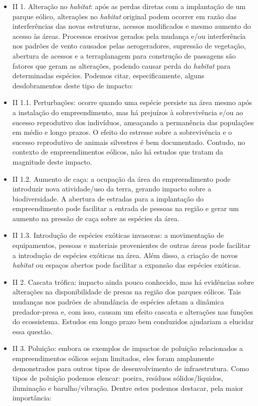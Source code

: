 \documentclass[
  oneside]{scrbook}
\providecommand{\tightlist}{%
  \setlength{\itemsep}{0pt}\setlength{\parskip}{0pt}}
\begin{document}
\begin{itemize}
\tightlist
\item
  II 1. Alteração no \emph{habitat}: após as perdas diretas com a implantação de um parque eólico, alterações no \emph{habitat} original podem ocorrer em razão das interferências das novas estruturas, acessos modificados e mesmo aumento do acesso às áreas. Processos erosivos gerados pela mudança e/ou interferência nos padrões de vento causados pelas aerogeradores, supressão de vegetação, abertura de acessos e a terraplanagem para construção de passagens são fatores que geram as alterações, podendo causar perda do \emph{habitat} para determinadas espécies. Podemos citar, especificamente, alguns desdobramentos deste tipo de impacto:
\item
  II 1.1. Perturbações: ocorre quando uma espécie persiste na área mesmo após a instalação do empreendimento, mas há prejuízos à sobrevivência e/ou ao sucesso reprodutivo dos indivíduos, ameaçando a permanência das populações em médio e longo prazos. O efeito do estresse sobre a sobrevivência e o sucesso reprodutivo de animais silvestres é bem documentado. Contudo, no contexto de empreendimentos eólicos, não há estudos que tratam da magnitude deste impacto.
\item
  II 1.2. Aumento de caça: a ocupação da área do empreendimento pode introduzir nova atividade/uso da terra, gerando impacto sobre a biodiversidade. A abertura de estradas para a implantação do empreendimento pode facilitar a entrada de pessoas na região e gerar um aumento na pressão de caça sobre as espécies da área.
\item
  II 1.3. Introdução de espécies exóticas invasoras: a movimentação de equipamentos, pessoas e materiais provenientes de outras áreas pode facilitar a introdução de espécies exóticas na área. Além disso, a criação de novos \emph{habitat} ou espaços abertos pode facilitar a expansão das espécies exóticas.
\item
  II 2. Cascata trófica: impacto ainda pouco conhecido, mas há evidências sobre alterações na disponibilidade de presas na região dos parques eólicos. Tais mudanças nos padrões de abundância de espécies afetam a dinâmica predador-presa e, com isso, causam um efeito cascata e alterações nas funções do ecossistema. Estudos em longo prazo bem conduzidos ajudariam a elucidar essa questão.
\item
  II 3. Poluição: embora os exemplos de impactos de poluição relacionados a empreendimentos eólicos sejam limitados, eles foram amplamente demonstrados para outros tipos de desenvolvimento de infraestrutura. Como tipos de poluição podemos elencar: poeira, resíduos sólidos/líquidos, iluminação e barulho/vibração. Dentre estes podemos destacar, pela maior importância:

\end{itemize}
\end{document}
